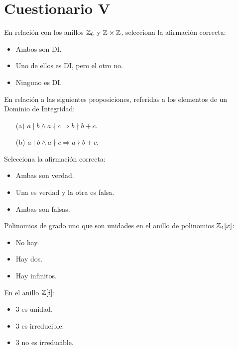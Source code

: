 \section{Cuestionario V}

\begin{ejercicio}
    En relación con los anillos $\mathbb{Z}_6$ y $\mathbb{Z} \times \mathbb{Z}$, selecciona la afirmación correcta:
    \begin{itemize}
        \item Ambos son DI.
        \item Uno de ellos es DI, pero el otro no.
        \item Ninguno es DI.
    \end{itemize}
\end{ejercicio}

\begin{ejercicio}
    En relación a las siguientes proposiciones, referidas a los elementos de un Dominio de Integridad:
    \begin{enumerate}
        \item [(a)] $a\mid b \land a \nmid c \Rightarrow b \nmid b+c$.
        \item [(b)] $a\mid b \land a \nmid c \Rightarrow a \nmid b+c$.
    \end{enumerate}
    Selecciona la afirmación correcta:
    \begin{itemize}
        \item Ambas son verdad.
        \item Una es verdad y la otra es falsa.
        \item Ambas son falsas.
    \end{itemize}
\end{ejercicio}

\begin{ejercicio}
    Polinomios de grado uno que son unidades en el anillo de polinomios $\mathbb{Z}_4[x]$:
    \begin{itemize}
        \item No hay.
        \item Hay dos.
        \item Hay infinitos.
    \end{itemize}
\end{ejercicio}

\begin{ejercicio}
    En el anillo $\mathbb{Z}[i]$:
    \begin{itemize}
        \item $3$ es unidad.
        \item $3$ es irreducible.
        \item $3$ no es irreducible.
    \end{itemize}
\end{ejercicio}

